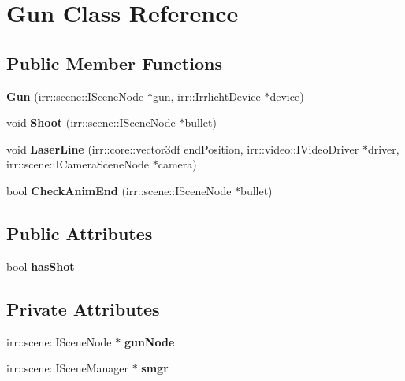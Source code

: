 \hypertarget{class_gun}{}\section{Gun Class Reference}
\label{class_gun}
\subsection*{Public Member Functions}
\begin{DoxyCompactItemize}
\item 
\mbox{\label{class_gun_a0009484ffd24245d079b9acb3016f6cd}} 
{\bfseries Gun} (irr\+::scene\+::\+I\+Scene\+Node $\ast$gun, irr\+::\+Irrlicht\+Device $\ast$device)
\item 
\mbox{\label{class_gun_aa1c047f8d241f2a8b6a584477767b4ec}} 
void {\bfseries Shoot} (irr\+::scene\+::\+I\+Scene\+Node $\ast$bullet)
\item 
\mbox{\label{class_gun_ae35bb130cef3146dd0eff59ade621069}} 
void {\bfseries Laser\+Line} (irr\+::core\+::vector3df end\+Position, irr\+::video\+::\+I\+Video\+Driver $\ast$driver, irr\+::scene\+::\+I\+Camera\+Scene\+Node $\ast$camera)
\item 
\mbox{\label{class_gun_a9edcbf305d85e9052fc4773e938f248e}} 
bool {\bfseries Check\+Anim\+End} (irr\+::scene\+::\+I\+Scene\+Node $\ast$bullet)
\end{DoxyCompactItemize}
\subsection*{Public Attributes}
\begin{DoxyCompactItemize}
\item 
\mbox{\label{class_gun_ac784396848d854a74100b0826e384c3d}} 
bool {\bfseries has\+Shot}
\end{DoxyCompactItemize}
\subsection*{Private Attributes}
\begin{DoxyCompactItemize}
\item 
\mbox{\label{class_gun_a56a750ec1cffe0cc65802cc0034449dc}} 
irr\+::scene\+::\+I\+Scene\+Node $\ast$ {\bfseries gun\+Node}
\item 
\mbox{\label{class_gun_a61990e84dfab6ae29e6808691cc21db2}} 
irr\+::scene\+::\+I\+Scene\+Manager $\ast$ {\bfseries smgr}
\end{DoxyCompactItemize}


